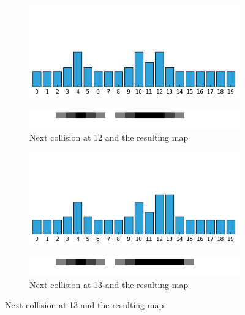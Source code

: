 \begin{exmp}
\begin{figure}
\begin{minipage}{0.48\textwidth}
\centering
\begin{subfigure}{\textwidth}
\centering
\includegraphics[scale=0.4]{./images/ex24/ex24coll12.png}
\end{subfigure}
\begin{subfigure}{\textwidth}
\centering
\includegraphics[scale=0.4]{./images/ex24/ex24wall12.png}
\caption{Next collision at 12 and the resulting map}
\end{subfigure}
\end{minipage}
\begin{minipage}{0.48\textwidth}
\centering
\begin{subfigure}{\textwidth}
\centering
\includegraphics[scale=0.4]{./images/ex24/ex24coll13.png}
\end{subfigure}
\begin{subfigure}{\textwidth}
\centering
\includegraphics[scale=0.4]{./images/ex24/ex24wall13.png}
\caption{Next collision at 13 and the resulting map}
\end{subfigure}
\end{minipage}


\end{figure}
\end{exmp}
